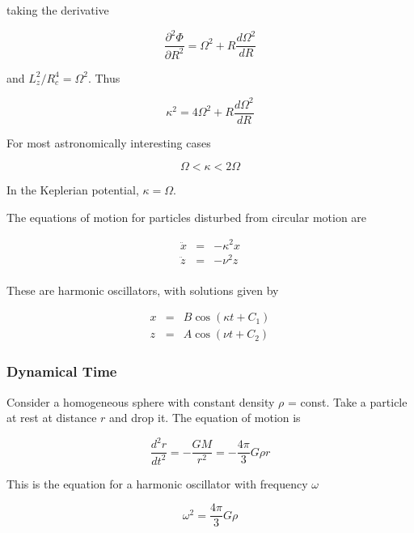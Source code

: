 taking the derivative 

\begin{equation}
\frac{\partial^2 \varPhi}{\partial R^2} = \Omega^2 + R\frac{d\Omega^2}{d R} 
\end{equation}

and $L_z^2/R_c^4 = \Omega^2$. Thus 


\begin{equation}
\kappa^2 = 4\Omega^2 + R\frac{d\Omega^2}{d R} 
\end{equation}

For most astronomically interesting cases 

\begin{equation}
\Omega < \kappa < 2\Omega
\end{equation}

In the Keplerian potential, $\kappa=\Omega$. 

The equations of motion for particles disturbed from circular motion are


\begin{eqnarray}
\ddot{x} &=& -\kappa^2 x \\
\ddot{z} &=& -\nu^2 z \\
\end{eqnarray}


These are harmonic oscillators, with solutions given by

\begin{eqnarray}
x &=& B\cos(\kappa t + C_1) \\
z &=& A\cos(\nu t + C_2) 
\end{eqnarray}

\subsubsection{Dynamical Time}

Consider a homogeneous sphere with constant density $\rho$ = const. Take a particle at rest at distance $r$ and drop it. The equation of motion is 

\begin{equation}
\frac{d^2r}{dt^2} = - \frac{GM}{r^2} = - \frac{4\pi}{3}G\rho r
\end{equation}

This is the equation for a harmonic oscillator with frequency $\omega$

\begin{equation}
\omega^2  = \frac{4\pi}{3}G\rho
\end{equation}

